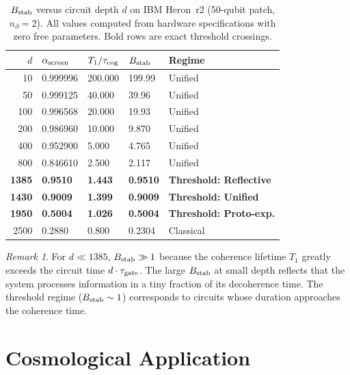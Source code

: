 \documentclass[12pt,letterpaper]{article}
\theoremstyle{definition}
\theoremstyle{remark}
\newtheorem{remark}[theorem]{Remark}
\newcommand{\ascreen}{\alpha_{\rm screen}}
\newcommand{\Bstab}{B_{\rm stab}}
\newcommand{\taugate}{\tau_{\rm gate}}
\newcommand{\taucog}{\tau_{\rm cog}}
\begin{document}
\begin{table}[htbp]
\centering
\caption{$\Bstab$ versus circuit depth $d$ on IBM Heron~r2 (50-qubit patch,
$n_\partial = 2$).
All values computed from hardware specifications with zero free parameters.
Bold rows are exact threshold crossings.}
\label{tab:Bstab}
\renewcommand{\arraystretch}{1.3}
\begin{tabular}{@{}rllll@{}}
\toprule
$d$ & $\ascreen$ & $T_1/\taucog$ & $\Bstab$ & Regime \\
\midrule
10   & 0.999996 & 200.000 & 199.99 & Unified \\
50   & 0.999125 & 40.000  & 39.96  & Unified \\
100  & 0.996568 & 20.000  & 19.93  & Unified \\
200  & 0.986960 & 10.000  & 9.870  & Unified \\
400  & 0.952900 & 5.000   & 4.765  & Unified \\
800  & 0.846610 & 2.500   & 2.117  & Unified \\
\textbf{1385} & \textbf{0.9510} & \textbf{1.443}
  & \textbf{0.9510} & \textbf{Threshold: Reflective} \\
\textbf{1430} & \textbf{0.9009} & \textbf{1.399}
  & \textbf{0.9009} & \textbf{Threshold: Unified} \\
\textbf{1950} & \textbf{0.5004} & \textbf{1.026}
  & \textbf{0.5004} & \textbf{Threshold: Proto-exp.} \\
2500 & 0.2880   & 0.800   & 0.2304 & Classical \\
\bottomrule
\end{tabular}
\end{table}

\begin{remark}
For $d \ll 1385$, $\Bstab \gg 1$ because the coherence lifetime $T_1$ greatly exceeds
the circuit time $d\cdot\taugate$.
The large $\Bstab$ at small depth reflects that the system processes information in
a tiny fraction of its decoherence time.
The threshold regime ($\Bstab \sim 1$) corresponds to circuits whose duration approaches
the coherence time.
\end{remark}

\section{Cosmological Application}
\label{sec:cosmo}
\end{document}
